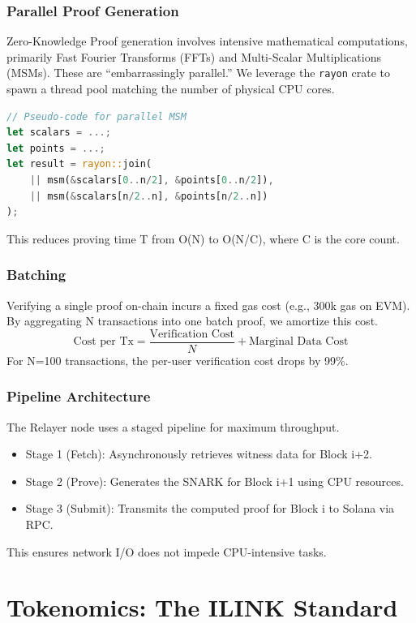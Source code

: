 \documentclass[11pt,a4paper]{article}
\begin{document}
\subsubsection{Parallel Proof Generation}
Zero-Knowledge Proof generation involves intensive mathematical computations, primarily Fast Fourier Transforms (FFTs) and Multi-Scalar Multiplications (MSMs). These are ``embarrassingly parallel.'' We leverage the \texttt{rayon} crate to spawn a thread pool matching the number of physical CPU cores.
\begin{lstlisting}[language=Rust, caption={Parallel MSM Example}]
// Pseudo-code for parallel MSM
let scalars = ...;
let points = ...;
let result = rayon::join(
    || msm(&scalars[0..n/2], &points[0..n/2]),
    || msm(&scalars[n/2..n], &points[n/2..n])
);
\end{lstlisting}
This reduces proving time T from O(N) to O(N/C), where C is the core count.

\subsubsection{Batching}
Verifying a single proof on-chain incurs a fixed gas cost (e.g., 300k gas on EVM). By aggregating N transactions into one batch proof, we amortize this cost.
$$ \text{Cost per Tx} = \frac{\text{Verification Cost}}{N} + \text{Marginal Data Cost} $$
For N=100 transactions, the per-user verification cost drops by 99\%.

\subsubsection{Pipeline Architecture}
The Relayer node uses a staged pipeline for maximum throughput.
\begin{itemize}
    \item Stage 1 (Fetch): Asynchronously retrieves witness data for Block i+2.
    \item Stage 2 (Prove): Generates the SNARK for Block i+1 using CPU resources.
    \item Stage 3 (Submit): Transmits the computed proof for Block i to Solana via RPC.
\end{itemize}
This ensures network I/O does not impede CPU-intensive tasks.

\section{Tokenomics: The ILINK Standard}
\label{sec:tokenomics}
\end{document}
